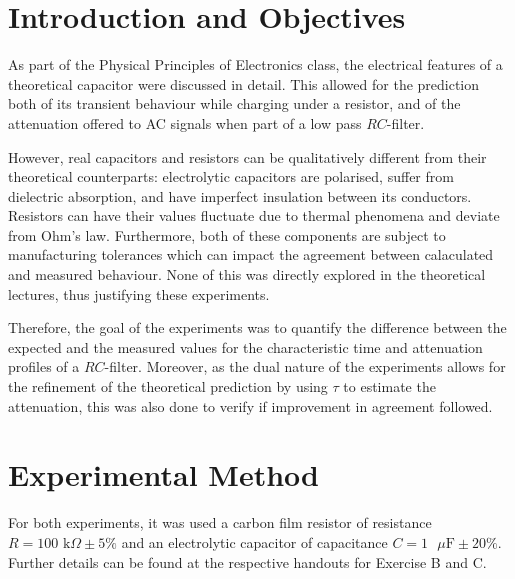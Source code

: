 \documentclass{article}
\begin{document}
\newcommand{\Vout}{V_{\text{out}}}
\newcommand{\Vin}{V_{\text{in}}}
\newcommand{\Vusb}{V_{\text{USB}}}
\newcommand{\vout}{v_{\text{out}}}
\newcommand{\vin}{v_{\text{in}}}
\section{Introduction and Objectives}
As part of the Physical Principles of Electronics class, the electrical features of a theoretical capacitor were discussed in detail. This allowed for the prediction both of its transient behaviour while charging under a resistor, and of the attenuation offered to AC signals when part of a low pass $RC$-filter.
\par However, real capacitors and resistors can be qualitatively different from their theoretical counterparts: electrolytic capacitors are polarised, suffer from dielectric absorption, and have imperfect insulation between its conductors. Resistors can have their values fluctuate due to thermal phenomena and deviate from Ohm's law. Furthermore, both of these components are subject to manufacturing tolerances which can impact the agreement between calaculated and measured behaviour. None of this was directly explored in the theoretical lectures, thus justifying these experiments.
\par Therefore, the goal of the experiments was to quantify the difference between the expected and the measured values for the characteristic time and attenuation profiles of a $RC$-filter. Moreover, as the dual nature of the experiments allows for the refinement of the theoretical prediction by using $\tau$ to estimate the attenuation, this was also done to verify if improvement in agreement followed. 
\section{Experimental Method}
For both experiments, it was used a carbon film resistor of resistance ${R = 100 \text{ k}\Omega \pm 5\%}$ and an electrolytic capacitor of capacitance ${C = 1 \text{ }\mu\text{F} \pm 20\%}$. Further details can be found at the respective handouts for Exercise B and C.
\end{document}
